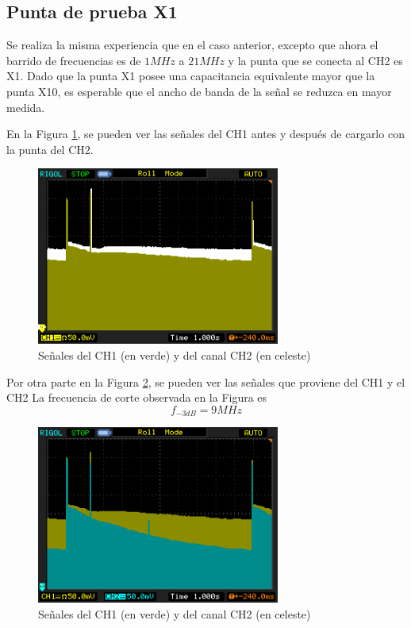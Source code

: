 \documentclass[a4paper,10pt]{article}
\begin{document}
		\subsection{Punta de prueba X1}
		Se realiza la misma experiencia que en el caso anterior, excepto que ahora el barrido de frecuencias es de $1MHz$ a $21MHz$ y la punta que se conecta al CH2 es X1. Dado que la punta X1 posee una capacitancia equivalente mayor que la punta X10, es esperable que el ancho de banda de la se\~nal se reduzca en mayor medida.

		En la Figura \ref{img003}, se pueden ver las se\~nales del CH1 antes y despu\'es de cargarlo con la punta del CH2. 
		\begin{figure}[!htb]
			\centering
			\includegraphics[width=8cm]{Imagenes/Mediciones instrumentos/NewFile4.png}
			\caption{Se\~nales del CH1 (en verde) y del canal CH2 (en celeste)} \label{img003}
		\end{figure}
		Por otra parte en la Figura \ref{img002}, se pueden ver las se\~nales que proviene del CH1 y el CH2
		La frecuencia de corte observada en la Figura es $$f_{-3dB}=9MHz$$
		\begin{figure}[!htb]
			\centering
			\includegraphics[width=8cm]{Imagenes/Mediciones instrumentos/NewFile3.png}
			\caption{Se\~nales del CH1 (en verde) y del canal CH2 (en celeste)} \label{img002}
		\end{figure}						
		
\end{document}
